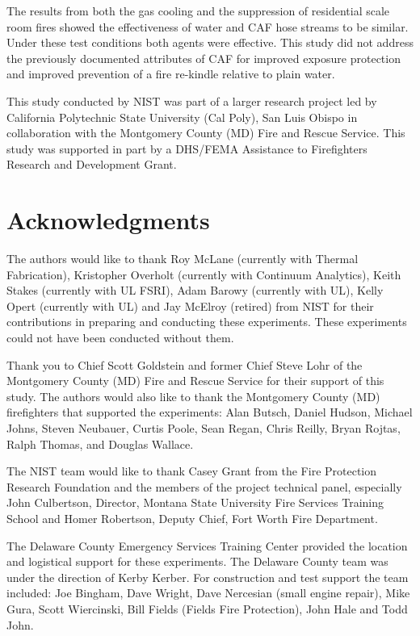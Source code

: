 \documentclass[12pt,oneside]{book}
\begin{document}
The results from both the gas cooling and the suppression of residential scale room fires showed the effectiveness of water and CAF hose streams to be similar. Under these test conditions both agents were effective. This study did not address the previously documented attributes of CAF for improved exposure protection and improved prevention of a fire re-kindle relative to plain water. 

This study conducted by NIST was part of a larger research project led by California Polytechnic State University (Cal Poly), San Luis Obispo in collaboration with the Montgomery County (MD) Fire and Rescue Service. This study was supported in part by a DHS/FEMA Assistance to Firefighters Research and Development Grant.  


\chapter{Acknowledgments}
\label{chap:acknowledgments}

The authors would like to thank Roy McLane (currently with Thermal Fabrication), Kristopher Overholt (currently with Continuum Analytics), Keith Stakes (currently with UL FSRI), Adam Barowy (currently with UL), Kelly Opert (currently with UL) and Jay McElroy (retired) from NIST for their contributions in preparing and conducting these experiments. These experiments could not have been conducted without them. 

Thank you to Chief Scott Goldstein and former Chief Steve Lohr of the Montgomery County (MD) Fire and Rescue Service for their support of this study. The authors would also like to thank the Montgomery County (MD) firefighters that supported the experiments: Alan Butsch, Daniel Hudson, Michael Johns, Steven Neubauer, Curtis Poole, Sean Regan, Chris Reilly, Bryan Rojtas, Ralph Thomas, and Douglas Wallace. 

The NIST team would like to thank Casey Grant from the Fire Protection Research Foundation and the members of the project technical panel, especially John Culbertson, Director, Montana State University Fire Services Training School and Homer Robertson, Deputy Chief, Fort Worth Fire Department.  

The Delaware County Emergency Services Training Center provided the location and logistical support for these experiments. The Delaware County team was under the direction of Kerby Kerber.  For construction and test support the team included: Joe Bingham, Dave Wright, Dave Nercesian (small engine repair), Mike Gura, Scott Wiercinski, Bill Fields (Fields Fire Protection), John Hale and Todd John.
\end{document}
